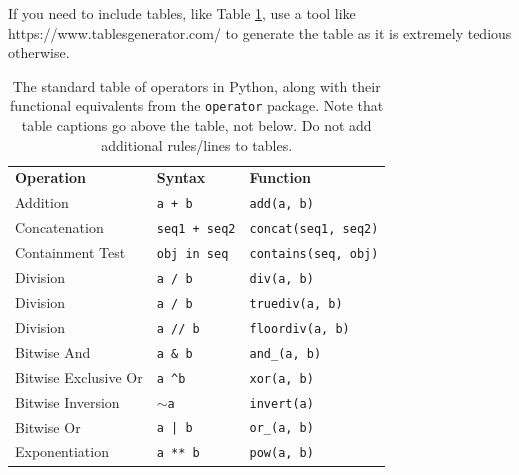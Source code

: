 \documentclass{l4proj}
\begin{document}
If you need to include tables, like Table \ref{tab:operators}, use a tool like https://www.tablesgenerator.com/ to generate the table as it is
extremely tedious otherwise. 

\begin{table}[]
    \caption{The standard table of operators in Python, along with their functional equivalents from the \texttt{operator} package. Note that table
    captions go above the table, not below. Do not add additional rules/lines to tables. }\label{tab:operators}
    \begin{tabular}{@{}lll@{}}
    \textbf{Operation}    & \textbf{Syntax}                & \textbf{Function}                            \\ %
    Addition              & \texttt{a + b}                          & \texttt{add(a, b)}                                    \\
    Concatenation         & \texttt{seq1 + seq2}                    & \texttt{concat(seq1, seq2)}                           \\
    Containment Test      & \texttt{obj in seq}                     & \texttt{contains(seq, obj)}                           \\
    Division              & \texttt{a / b}                          & \texttt{div(a, b) }  \\
    Division              & \texttt{a / b}                          & \texttt{truediv(a, b) } \\
    Division              & \texttt{a // b}                         & \texttt{floordiv(a, b)}                               \\
    Bitwise And           & \texttt{a \& b}                         & \texttt{and\_(a, b)}                                  \\
    Bitwise Exclusive Or  & \texttt{a \textasciicircum b}           & \texttt{xor(a, b)}                                    \\
    Bitwise Inversion     & \texttt{$\sim$a}                        & \texttt{invert(a)}                                    \\
    Bitwise Or            & \texttt{a | b}                          & \texttt{or\_(a, b)}                                   \\
    Exponentiation        & \texttt{a ** b}                         & \texttt{pow(a, b)}                                    \\

\end{tabular}
\end{table}
\end{document}
